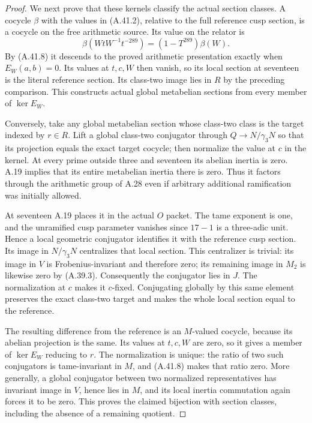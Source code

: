 \begin{proof}
We next prove that these kernels classify the actual section
classes. A cocycle $\beta$ with the values in (A.41.2),
relative to the full reference cusp section, is a cocycle
on the free arithmetic source. Its value on the relator is
\[
 \beta(WtW^{-1}t^{-289})=(1-T^{289})\beta(W).
 \tag{A.41.10}
\]
By (A.41.8) it descends to the proved arithmetic presentation
exactly when $E_W(a,b)=0$. Its values at $t,c,W$ then vanish,
so its local section at seventeen is the literal reference
section. Its class-two image lies in $R$ by the preceding
comparison. This constructs actual global metabelian sections
from every member of $\ker E_W$.

Conversely, take any global metabelian section whose class-two
class is the target indexed by $r\in R$. Lift a global
class-two conjugator through $Q\to N/\gamma_3N$ so that its
projection equals the exact target cocycle; then normalize
the value at $c$ in the kernel. At every prime outside three
and seventeen its abelian inertia is zero. A.19 implies that
its entire metabelian inertia there is zero. Thus it factors
through the arithmetic group of A.28 even if arbitrary
additional ramification was initially allowed.

At seventeen A.19 places it in the actual $O$ packet. The
tame exponent is one, and the unramified cusp parameter
vanishes since $17-1$ is a three-adic unit. Hence a local
geometric conjugator identifies it with the reference cusp
section. Its image in $N/\gamma_3N$ centralizes that local
section. This centralizer is trivial: its image in $V$ is
Frobenius-invariant and therefore zero; its remaining image
in $M_2$ is likewise zero by (A.39.3). Consequently the
conjugator lies in $J$. The normalization at $c$ makes it
$c$-fixed. Conjugating globally by this same element preserves
the exact class-two target and makes the whole local section
equal to the reference.

The resulting difference from the reference is an $M$-valued
cocycle, because its abelian projection is the same. Its
values at $t,c,W$ are zero, so it gives a member of
$\ker E_W$ reducing to $r$. The normalization is unique:
the ratio of two such conjugators is tame-invariant in $M$,
and (A.41.8) makes that ratio zero. More generally, a global
conjugator between two normalized representatives has
invariant image in $V$, hence lies in $M$, and its local
inertia commutation again forces it to be zero. This proves
the claimed bijection with section classes, including the
absence of a remaining quotient.


\end{proof}
